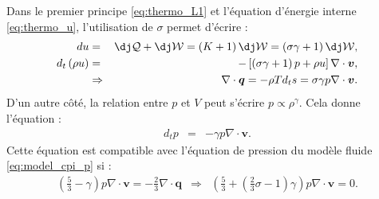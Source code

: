 Dans le premier principe \eqref{eq:thermo_L1} et l'équation d'énergie interne \eqref{eq:thermo_u}, l'utilisation de $\sigma$ permet d'écrire : 
\begin{eqnarray}
\label{eq:thermo_sig_L1}    du &=& \dj \mathcal{Q} + \dj \mathcal{W} = \left(K+1\right) \dj \mathcal{W} = \left(\sigma \gamma + 1\right) \dj \mathcal{W} ,\\
\label{eq:thermo_sig_u}    d_t\left(\rho u\right) &=& -\left[\left(\sigma \gamma + 1\right) p + \rho u\right] \nabla \cdot \boldsymbol{v} ,\\
 \label{eq:thermo_sig_q}   &\Rightarrow& \nabla \cdot \boldsymbol{q} = -\rho T d_t s = \sigma \gamma p \nabla \cdot \boldsymbol{v}.
\end{eqnarray}
D'un autre côté, la relation entre $p$ et $V$ peut s'écrire $p \propto \rho^{\gamma}$. Cela donne l'équation : 
\begin{eqnarray}
 \label{eq:thermo_sig_p}   d_t p &=& -\gamma p \nabla \cdot \boldsymbol{v}.
\end{eqnarray}
Cette équation est compatible avec l'équation de pression du modèle fluide \eqref{eq:model_cpi_p} si :
\begin{eqnarray}
\label{eq:thermo_sig_gq}     \left(\frac{5}{3} -\gamma\right) p \nabla \cdot \boldsymbol{v} = -\frac{2}{3} \nabla \cdot \boldsymbol{q} 
\label{eq:thermo_sig_g}     &\Rightarrow& \left(\frac{5}{3} +\left(\frac{2}{3}\sigma-1\right)\gamma\right) p \nabla \cdot \boldsymbol{v} = 0 .
\end{eqnarray}
